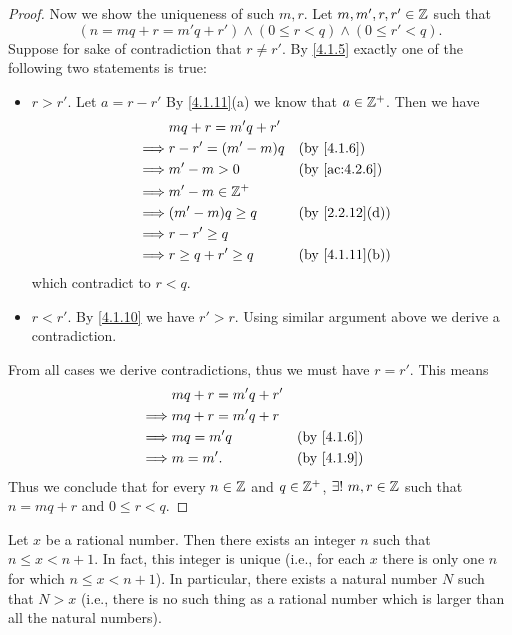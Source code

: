 \begin{proof}
  Now we show the uniqueness of such \(m, r\).
  Let \(m, m', r, r' \in \mathbb{Z}\) such that
  \[
    (n = mq + r = m'q + r') \land (0 \leq r < q) \land (0 \leq r' < q).
  \]
  Suppose for sake of contradiction that \(r \neq r'\).
  By \cref{4.1.5} exactly one of the following two statements is true:
  \begin{itemize}
    \item \(r > r'\).
          Let \(a = r - r'\)
          By \cref{4.1.11}(a) we know that \(a \in \mathbb{Z}^+\).
          Then we have
          \begin{align*}
                     & mq + r = m'q + r'                                      \\
            \implies & r - r' = (m' - m)q   &  & \text{(by \cref{4.1.6})}     \\
            \implies & m' - m > 0           &  & \text{(by \cref{ac:4.2.6})}  \\
            \implies & m' - m \in \Z^+                                        \\
            \implies & (m' - m)q \geq q     &  & \text{(by \cref{2.2.12}(d))} \\
            \implies & r - r' \geq q                                          \\
            \implies & r \geq q + r' \geq q &  & \text{(by \cref{4.1.11}(b))}
          \end{align*}
          which contradict to \(r < q\).
    \item \(r < r'\).
          By \cref{4.1.10} we have \(r' > r\).
          Using similar argument above we derive a contradiction.
  \end{itemize}
  From all cases we derive contradictions, thus we must have \(r = r'\).
  This means
  \begin{align*}
             & mq + r = m'q + r'                               \\
    \implies & mq + r = m'q + r                                \\
    \implies & mq = m'q          &  & \text{(by \cref{4.1.6})} \\
    \implies & m = m'.           &  & \text{(by \cref{4.1.9})}
  \end{align*}
  Thus we conclude that for every \(n \in \mathbb{Z}\) and \(q \in \mathbb{Z}^+\), \(\exists!\ m, r \in \mathbb{Z}\) such that \(n = mq + r\) and \(0 \leq r < q\).
\end{proof}

\begin{prop}\label{4.4.1}
  Let \(x\) be a rational number.
  Then there exists an integer \(n\) such that \(n \leq x < n + 1\).
  In fact, this integer is unique (i.e., for each \(x\) there is only one \(n\) for which \(n \leq x < n + 1\)).
  In particular, there exists a natural number \(N\) such that \(N > x\)
  (i.e., there is no such thing as a rational number which is larger than all the natural numbers).
\end{prop}


